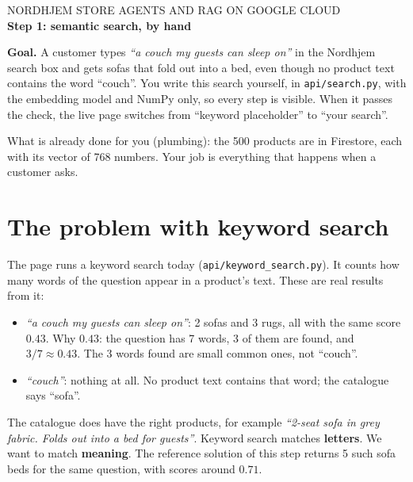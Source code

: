 \documentclass[11pt,a4paper]{article}
\newcommand{\code}[1]{\texttt{#1}}
\begin{document}
{\sffamily
{\small\color{muted} NORDHJEM STORE \textperiodcentered{} AGENTS AND RAG ON GOOGLE CLOUD}\\[0.4em]
{\LARGE\bfseries Step 1: semantic search, by hand}\\[0.6em]
}

\textbf{Goal.} A customer types \emph{``a couch my guests can sleep on''}
in the Nordhjem search box and gets sofas that fold out into a bed, even
though no product text contains the word ``couch''. You write this
search yourself, in \code{api/search.py}, with the embedding model and
NumPy only, so every step is visible. When it passes the check, the live
page switches from ``keyword placeholder'' to ``your search''.

What is already done for you (plumbing): the 500 products are in
Firestore, each with its vector of 768 numbers. Your job is everything
that happens when a customer asks.

\tableofcontents

\section{The problem with keyword search}

The page runs a keyword search today (\code{api/keyword\_search.py}). It
counts how many words of the question appear in a product's text. These
are real results from it:

\begin{itemize}[leftmargin=1.4em]
  \item \emph{``a couch my guests can sleep on''}: 2 sofas and 3 rugs,
        all with the same score $0.43$. Why $0.43$: the question has 7
        words, 3 of them are found, and $3 / 7 \approx 0.43$. The 3 words
        found are small common ones, not ``couch''.
  \item \emph{``couch''}: nothing at all. No product text contains that
        word; the catalogue says ``sofa''.
\end{itemize}

The catalogue does have the right products, for example \emph{``2-seat
sofa in grey fabric. Folds out into a bed for guests''}. Keyword search
matches \textbf{letters}. We want to match \textbf{meaning}. The
reference solution of this step returns 5 such sofa beds for the same
question, with scores around $0.71$.

\end{document}
